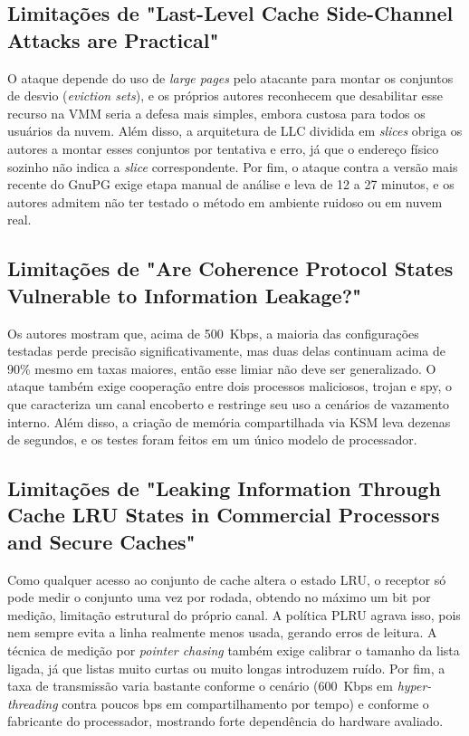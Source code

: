 \documentclass[12pt]{article}
\begin{document}
\subsection{Limitações de "Last-Level Cache Side-Channel Attacks are Practical"~\cite{7163050}}

O ataque depende do uso de \textit{large pages} pelo atacante para montar os conjuntos de desvio (\textit{eviction sets}), e os próprios autores reconhecem que desabilitar esse recurso na VMM seria a defesa mais simples, embora custosa para todos os usuários da nuvem. Além disso, a arquitetura de LLC dividida em \textit{slices} obriga os autores a montar esses conjuntos por tentativa e erro, já que o endereço físico sozinho não indica a \textit{slice} correspondente. Por fim, o ataque contra a versão mais recente do GnuPG exige etapa manual de análise e leva de 12 a 27 minutos, e os autores admitem não ter testado o método em ambiente ruidoso ou em nuvem real.

\subsection{Limitações de "Are Coherence Protocol States Vulnerable to Information Leakage?"~\cite{8327007}}

Os autores mostram que, acima de 500~Kbps, a maioria das configurações testadas perde precisão significativamente, mas duas delas continuam acima de 90\% mesmo em taxas maiores, então esse limiar não deve ser generalizado. O ataque também exige cooperação entre dois processos maliciosos, trojan e spy, o que caracteriza um canal encoberto e restringe seu uso a cenários de vazamento interno. Além disso, a criação de memória compartilhada via KSM leva dezenas de segundos, e os testes foram feitos em um único modelo de processador.

\subsection{Limitações de "Leaking Information Through Cache LRU States in Commercial Processors and Secure Caches"~\cite{9065598}}

Como qualquer acesso ao conjunto de cache altera o estado LRU, o receptor só pode medir o conjunto uma vez por rodada, obtendo no máximo um bit por medição, limitação estrutural do próprio canal. A política PLRU agrava isso, pois nem sempre evita a linha realmente menos usada, gerando erros de leitura. A técnica de medição por \textit{pointer chasing} também exige calibrar o tamanho da lista ligada, já que listas muito curtas ou muito longas introduzem ruído. Por fim, a taxa de transmissão varia bastante conforme o cenário (600~Kbps em \textit{hyper-threading} contra poucos bps em compartilhamento por tempo) e conforme o fabricante do processador, mostrando forte dependência do hardware avaliado.
\end{document}
